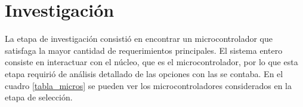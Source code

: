 \chapter{Investigación} %
\label{cha:investigacion}

La etapa de investigación consistió en encontrar un microcontrolador que satisfaga la mayor cantidad de requerimientos principales. El sistema entero consiste en interactuar con el n\'ucleo, que es el microcontrolador, por lo que esta etapa requirió de análisis detallado de las opciones con las se contaba. En el cuadro \ref{tabla_micros} se pueden ver los microcontroladores considerados en la etapa de selección.

\clearpage
\begin{landscape} %


\end{landscape}
